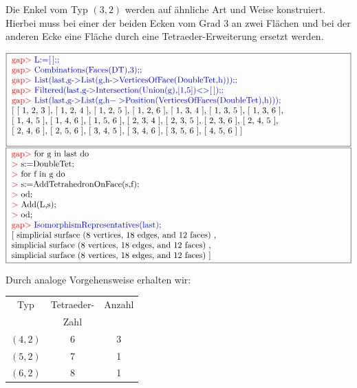 \documentclass[12pt,titlepage,twoside,cleardoublepage]{article}
\theoremstyle{nummermitklammern}
\numberwithin{equation}{section}
\begin{document}
 Die Enkel vom Typ $(3,2)$ werden auf ähnliche Art und Weise konstruiert. Hierbei muss bei einer der beiden Ecken vom Grad 3 an zwei Flächen und bei der anderen Ecke eine Fläche durch eine Tetraeder-Erweiterung ersetzt werden.
 \begin{center}
 $\fbox{
\parbox{14cm}{
\textcolor{red}{gap$>$} \textcolor{blue}{L:=[\,];;}\newline
\textcolor{red}{gap$>$} \textcolor{blue}{Combinations(Faces(DT),3);;}\newline
\textcolor{red}{gap$>$} \textcolor{blue}{List(last,g-$>$List(g,h-$>$VerticesOfFace(DoubleTet,h)));;}\newline
\textcolor{red}{gap$>$} \textcolor{blue}{Filtered(last,g-$>$Intersection(Union(g),[1,5])$<>$[\,]);;}\newline
\textcolor{red}{gap$>$} \textcolor{blue}{List(last,g-$>$List(g,h$->$Position(VerticesOfFaces(DoubleTet),h)));}\newline
[ [ 1, 2, 3 ], [ 1, 2, 4 ], [ 1, 2, 5 ], [ 1, 2, 6 ], [ 1, 3, 4 ],
  [ 1, 3, 5 ], [ 1, 3, 6 ], \newline
  [ 1, 4, 5 ], [ 1, 4, 6 ], [ 1, 5, 6 ],
  [ 2, 3, 4 ], [ 2, 3, 5 ], [ 2, 3, 6 ], [ 2, 4, 5 ], 
 \newline
  [ 2, 4, 6 ], [ 2, 5, 6 ], [ 3, 4, 5 ], [ 3, 4, 6 ], [ 3, 5, 6 ], [ 4, 5, 6 ] ]\newline
}}$
 $\fbox{
\parbox{14cm}{
\textcolor{red}{gap$>$} for g in last do\newline
\textcolor{red}{$>$} s:=DoubleTet;\newline
\textcolor{red}{$>$} for f in g do\newline
\textcolor{red}{$>$} s:=AddTetrahedronOnFace(s,f);\newline
\textcolor{red}{$>$} od;\newline
\textcolor{red}{$>$} Add(L,s);\newline
\textcolor{red}{$>$} od;\newline
\textcolor{red}{gap$>$} \textcolor{blue}{IsomorphismRepresentatives(last);}\newline
[ simplicial surface (8 vertices, 18 edges, and 12 faces)
    ,\newline
     simplicial surface (8 vertices, 18 edges, and 12 faces)
    ,\newline
  simplicial surface (8 vertices, 18 edges, and 12 faces)
 ]
}}$ 
\end{center}  
Durch analoge Vorgehensweise erhalten wir:
\begin{center}
\begin{tabular}{|c|c|c|}
\hline
 Typ&Tetraeder-  & Anzahl\\
&Zahl &\\
\hline
$(4,2)$&6& 3\\
\hline
$(5,2)$&7& 1\\
\hline
$(6,2)$&8& 1\\
\hline
\end{tabular}
\end{center}
\end{document}

